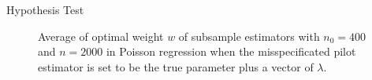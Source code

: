 \documentclass[12pt,hidelinks]{article}
\begin{document}
\begin{section}{Hypothesis Test}
\begin{figure}[htbp]
    \caption{Average of optimal weight $w$ of subsample estimators with $n_0 = 400$ and $n = 2000$ in Poisson regression when the misspecificated pilot estimator is set to be the true parameter plus a vector of $\lambda$.}
    \label{fig:poi_w}
\end{figure}









\end{section}
\end{document}
